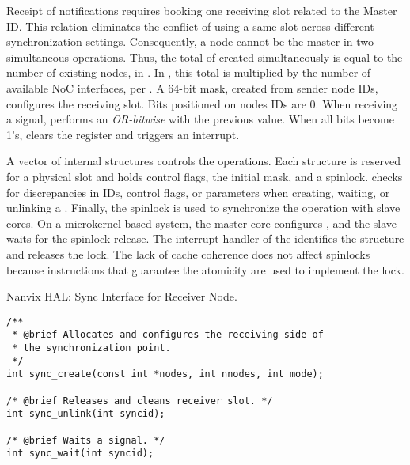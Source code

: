 				Receipt of notifications requires booking one \cnoc receiving slot
				related to the Master ID. This relation eliminates the conflict of
				using a same slot across different synchronization settings.
				Consequently, a node cannot be the master in two simultaneous operations.
				Thus, the total of \sync created simultaneously is equal to the number
				of existing nodes,  in \mppa. In \ioclusters, this total is
				multiplied by the number of available NoC interfaces,  per \dma.
				A 64-bit mask, created from sender node IDs, configures the receiving
				slot. Bits positioned on nodes IDs are 0. When receiving a signal,
				\dma performs an \textit{OR-bitwise} with the previous value. When
				all bits become 1's, \dma clears the register and triggers an interrupt.

				A vector of internal structures controls the operations. Each structure
				is reserved for a physical slot and holds control flags, the initial mask,
				and a spinlock. \hal checks for discrepancies in IDs, control flags, or
				parameters when creating, waiting, or unlinking a \sync. Finally,
				the spinlock is used to synchronize the operation with slave cores.
				On a microkernel-based system, the master core configures \sync, and
				the slave waits for the spinlock release. The interrupt handler of the
				\sync identifies the structure and releases the lock. The lack of cache
				coherence does not affect spinlocks because instructions that guarantee
				the atomicity are used to implement the lock.


\begin{listing}[!tb]
\caption{Nanvix HAL: Sync Interface for Receiver Node.}
\label{code:hal-sync-receiver}
\begin{verbatim}
/**
 * @brief Allocates and configures the receiving side of
 * the synchronization point.
 */
int sync_create(const int *nodes, int nnodes, int mode);

/* @brief Releases and cleans receiver slot. */
int sync_unlink(int syncid);

/* @brief Waits a signal. */
int sync_wait(int syncid);
\end{verbatim}
\end{listing}


